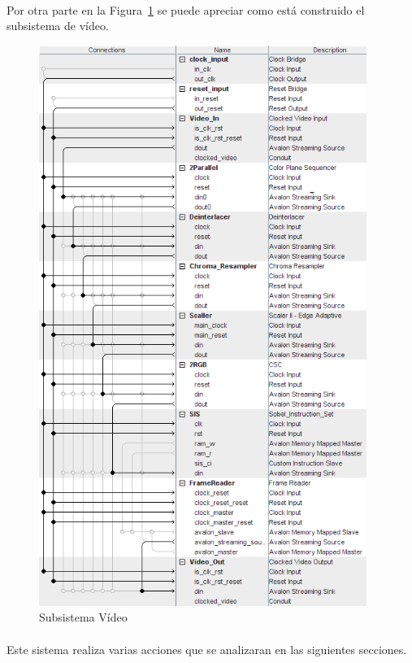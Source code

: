 \documentclass[a4paper,12pt,titlepage,final]{book}
\begin{document}
\paragraph{}
Por otra parte en la Figura~\ref{fig:Sistema Video} se puede apreciar como está construido el subsistema de vídeo.
\begin{figure}[p]
\centering
\includegraphics[height=0.95\textheight,
width=0.95\textwidth]{./figuras/SistemadeVideo/sistemadevideopagina1.png}
\caption{Subsistema Vídeo}
\label{fig:Sistema Video}
\end{figure}

\paragraph{}
Este sistema realiza varias acciones que se analizaran en las siguientes secciones.
\end{document}
